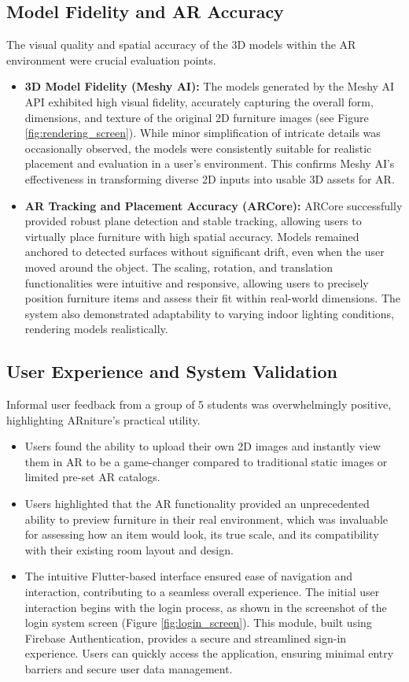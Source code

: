 \documentclass[12pt, a4paper]{article}
\begin{document}
\subsection{Model Fidelity and AR Accuracy}
The visual quality and spatial accuracy of the 3D models within the AR environment were crucial evaluation points.
\begin{itemize}
    \item \textbf{3D Model Fidelity (Meshy AI):} The models generated by the Meshy AI API exhibited high visual fidelity, accurately capturing the overall form, dimensions, and texture of the original 2D furniture images (see Figure \ref{fig:rendering_screen}). While minor simplification of intricate details was occasionally observed, the models were consistently suitable for realistic placement and evaluation in a user's environment. This confirms Meshy AI's effectiveness in transforming diverse 2D inputs into usable 3D assets for AR.
    \item \textbf{AR Tracking and Placement Accuracy (ARCore):} ARCore successfully provided robust plane detection and stable tracking, allowing users to virtually place furniture with high spatial accuracy. Models remained anchored to detected surfaces without significant drift, even when the user moved around the object. The scaling, rotation, and translation functionalities were intuitive and responsive, allowing users to precisely position furniture items and assess their fit within real-world dimensions. The system also demonstrated adaptability to varying indoor lighting conditions, rendering models realistically.
\end{itemize}

\subsection{User Experience and System Validation}
Informal user feedback from a group of 5 students was overwhelmingly positive, highlighting ARniture's practical utility.
\begin{itemize}
    \item Users found the ability to upload their own 2D images and instantly view them in AR to be a game-changer compared to traditional static images or limited pre-set AR catalogs.
    \item Users highlighted that the AR functionality provided an unprecedented ability to preview furniture in their real environment, which was invaluable for assessing how an item would look, its true scale, and its compatibility with their existing room layout and design.
    \item The intuitive Flutter-based interface ensured ease of navigation and interaction, contributing to a seamless overall experience. The initial user interaction begins with the login process, as shown in the screenshot of the login system screen (Figure \ref{fig:login_screen}). This module, built using Firebase Authentication, provides a secure and streamlined sign-in experience. Users can quickly access the application, ensuring minimal entry barriers and secure user data management.
\end{itemize}
\end{document}
